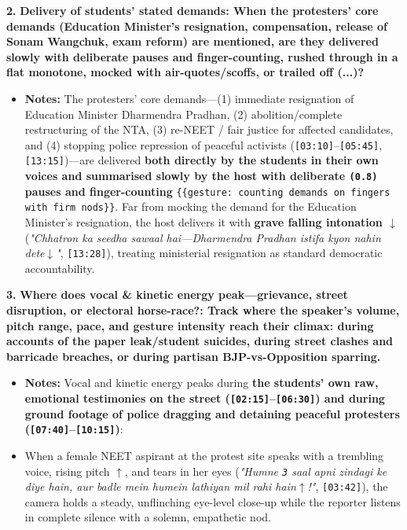 \documentclass[10pt,a4paper]{article}
\begin{document}
\noindent\textbf{2.} \textbf{Delivery of students' stated demands: When the protesters' core demands (Education Minister's resignation, compensation, release of Sonam Wangchuk, exam reform) are mentioned, are they delivered slowly with deliberate pauses and finger-counting, rushed through in a flat monotone, mocked with air-quotes/scoffs, or trailed off (...)?}\par\smallskip
\begin{itemize}
  \item \textbf{Notes:}
The protesters' core demands---(1) immediate resignation of Education Minister Dharmendra Pradhan, (2) abolition/complete restructuring of the NTA, (3) re-NEET / fair justice for affected candidates, and (4) stopping police repression of peaceful activists (\texttt{[03:10]}--\texttt{[05:45]}, \texttt{[13:15]})---are delivered \textbf{both directly by the students in their own voices and summarised slowly by the host with deliberate \texttt{(0.8)} pauses and finger-counting} \texttt{\{\{gesture: counting demands on fingers with firm nods\}\}}. Far from mocking the demand for the Education Minister's resignation, the host delivers it with \textbf{grave falling intonation \texttt{$\downarrow$}} (\textit{"Chhatron ka seedha sawaal hai---Dharmendra Pradhan istifa kyon nahin dete$\downarrow$"}, \texttt{[13:28]}), treating ministerial resignation as standard democratic accountability.\par\smallskip
\end{itemize}

\noindent\textbf{3.} \textbf{Where does vocal \& kinetic energy peak---grievance, street disruption, or electoral horse-race?: Track where the speaker's volume, pitch range, pace, and gesture intensity reach their climax: during accounts of the paper leak/student suicides, during street clashes and barricade breaches, or during partisan BJP-vs-Opposition sparring.}\par\smallskip
\begin{itemize}
  \item \textbf{Notes:}
Vocal and kinetic energy peaks during \textbf{the students' own raw, emotional testimonies on the street (\texttt{[02:15]}--\texttt{[06:30]}) and during ground footage of police dragging and detaining peaceful protesters (\texttt{[07:40]}--\texttt{[10:15]})}:\par\smallskip
  \item When a female NEET aspirant at the protest site speaks with a trembling voice, rising pitch \texttt{$\uparrow$}, and tears in her eyes (\textit{"Humne \texttt{3} saal apni zindagi ke diye hain, aur badle mein humein lathiyan mil rahi hain$\uparrow$!"}, \texttt{[03:42]}), the camera holds a steady, unflinching eye-level close-up while the reporter listens in complete silence with a solemn, empathetic nod.
\end{itemize}
\end{document}
